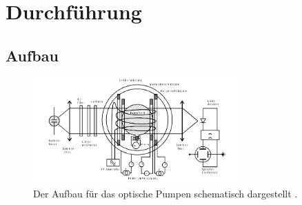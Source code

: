 \section{Durchführung}

\subsection{Aufbau}

\begin{figure}[h]
    \centering
    \includegraphics[width=0.7\textwidth]{latex/images/aufbau.PNG}
    \caption{Der Aufbau für das optische Pumpen schematisch dargestellt \protect \cite{V21}.}
    \label{img:aufb}
\end{figure}

